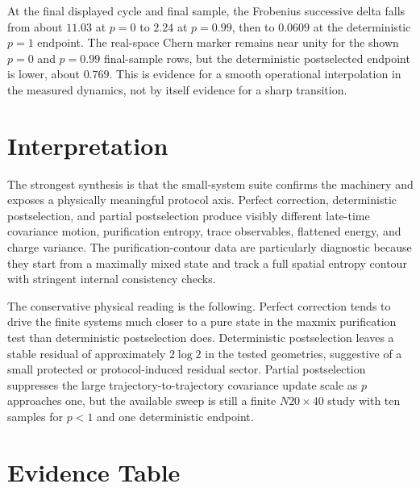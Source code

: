 \documentclass[aps,prb,onecolumn,nofootinbib,superscriptaddress]{revtex4-2}
\begin{document}
At the final displayed cycle and final sample, the Frobenius successive delta
falls from about $11.03$ at $p=0$ to $2.24$ at $p=0.99$, then to $0.0609$ at the
deterministic $p=1$ endpoint.  The real-space Chern marker remains near unity
for the shown $p=0$ and $p=0.99$ final-sample rows, but the deterministic
postselected endpoint is lower, about $0.769$.  This is evidence for a smooth
operational interpolation in the measured dynamics, not by itself evidence for a
sharp transition.

\section{Interpretation}

The strongest synthesis is that the small-system suite confirms the machinery
and exposes a physically meaningful protocol axis.  Perfect correction,
deterministic postselection, and partial postselection produce visibly different
late-time covariance motion, purification entropy, trace observables, flattened
energy, and charge variance.  The purification-contour data are particularly
diagnostic because they start from a maximally mixed state and track a full
spatial entropy contour with stringent internal consistency checks.

The conservative physical reading is the following.  Perfect correction tends to
drive the finite systems much closer to a pure state in the maxmix purification
test than deterministic postselection does.  Deterministic postselection leaves a
stable residual of approximately $2\log 2$ in the tested geometries, suggestive
of a small protected or protocol-induced residual sector.  Partial
postselection suppresses the large trajectory-to-trajectory covariance update
scale as $p$ approaches one, but the available sweep is still a finite
$N20\times40$ study with ten samples for $p<1$ and one deterministic endpoint.

\section{Evidence Table}
\end{document}
